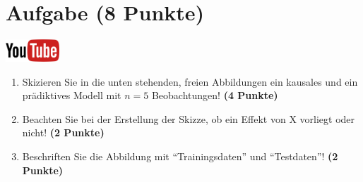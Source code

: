 \documentclass[a4paper, 9pt]{scrartcl}\usepackage[]{graphicx}\usepackage[]{xcolor}
\begin{document}
\clearpage

\section{Aufgabe \hfill (8 Punkte)}

\hfill\href{https://youtu.be/C_a8aOMI7GE}{\includegraphics[width =
  2cm]{img/youtube}}\\[1Ex]



\begin{enumerate}
\item Skizieren Sie in die unten stehenden, freien Abbildungen ein kausales
  und ein pr{\"a}diktives Modell mit $n = 5$
  Beobachtungen! \textbf{(4 Punkte)}
\item Beachten Sie bei der Erstellung der Skizze, ob ein Effekt von X
  vorliegt oder nicht! \textbf{(2 Punkte)}
\item Beschriften Sie die Abbildung mit "`Trainingsdaten"' und "`Testdaten"'!  \textbf{(2 Punkte)}
\end{enumerate}
\end{document}
